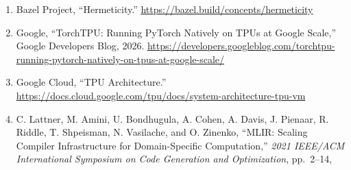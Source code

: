 \documentclass[
  10pt,
  american,
  10pt,
  letterpaper]{article}
\providecommand{\tightlist}{%
  \setlength{\itemsep}{0pt}\setlength{\parskip}{0pt}}
\begin{document}
\begin{enumerate}
\def\labelenumi{\arabic{enumi}.}
\tightlist
\item
  Bazel Project, ``Hermeticity.''
  \url{https://bazel.build/concepts/hermeticity}
\item
  Google, ``TorchTPU: Running PyTorch Natively on TPUs at Google
  Scale,'' Google Developers Blog, 2026.
  \url{https://developers.googleblog.com/torchtpu-running-pytorch-natively-on-tpus-at-google-scale/}
\item
  Google Cloud, ``TPU Architecture.''
  \url{https://docs.cloud.google.com/tpu/docs/system-architecture-tpu-vm}
\item
  C. Lattner, M. Amini, U. Bondhugula, A. Cohen, A. Davis, J. Pienaar,
  R. Riddle, T. Shpeisman, N. Vasilache, and O. Zinenko, ``MLIR: Scaling
  Compiler Infrastructure for Domain-Specific Computation,'' \emph{2021
  IEEE/ACM International Symposium on Code Generation and Optimization},
  pp.~2--14,


\end{enumerate}
\end{document}
